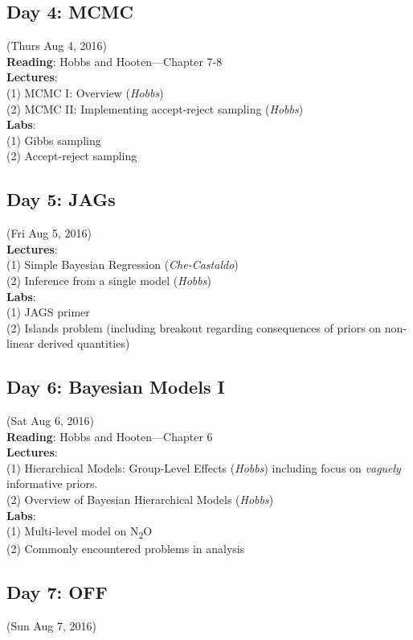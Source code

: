 \documentclass[12pt, oneside]{article}
\begin{document}
\newpage
\subsection*{Day 4:  MCMC} (Thurs Aug 4, 2016)\\
\textbf{Reading}: Hobbs and Hooten---Chapter 7-8\\
\textbf{Lectures}: \\
(1) MCMC I: Overview (\emph{Hobbs})\\
(2) MCMC II: Implementing accept-reject sampling (\emph{Hobbs})\\
\textbf{Labs}: \\
(1) Gibbs sampling \\
(2) Accept-reject sampling \\

\subsection*{Day 5: JAGs} (Fri Aug 5, 2016)\\
\textbf{Lectures}: \\
(1) Simple Bayesian Regression (\emph{Che-Castaldo}) \\
(2) Inference from a single model (\emph{Hobbs})\\
\textbf{Labs}: \\
(1) JAGS primer\\
(2) Islands problem (including breakout regarding consequences of priors on non-linear derived quantities)\\

\subsection*{Day 6: Bayesian Models I} (Sat Aug 6, 2016)\\
\textbf{Reading}: Hobbs and Hooten---Chapter 6\\
\textbf{Lectures}: \\
(1) Hierarchical Models: Group-Level Effects (\emph{Hobbs}) including focus on \emph{vaguely} informative priors.\\
(2) Overview of Bayesian Hierarchical Models (\emph{Hobbs}) \\
\textbf{Labs}: \\
(1) Multi-level model on N\textsubscript{2}O \\
(2) Commonly encountered problems in analysis\\

\subsection*{Day 7: OFF} (Sun Aug 7, 2016)\\
 \newpage
\end{document}
